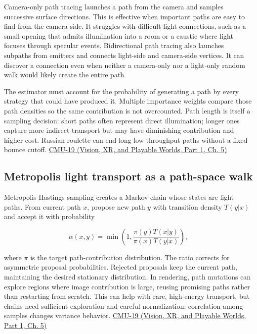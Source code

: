 Camera-only path tracing launches a path from the camera and samples successive surface directions. This is effective when important paths are easy to find from the camera side. It struggles with difficult light connections, such as a small opening that admits illumination into a room or a caustic where light focuses through specular events. Bidirectional path tracing also launches subpaths from emitters and connects light-side and camera-side vertices. It can discover a connection even when neither a camera-only nor a light-only random walk would likely create the entire path.

The estimator must account for the probability of generating a path by every strategy that could have produced it. Multiple importance weights compare those path densities so the same contribution is not overcounted. Path length is itself a sampling decision: short paths often represent direct illumination; longer ones capture more indirect transport but may have diminishing contribution and higher cost. Russian roulette can end long low-throughput paths without a fixed bounce cutoff. \href{../07-Vision-XR-and-Playable-Worlds-P01/main.pdf\#04-visual-computing-ii-ch036-cmu-19---variance-reduction}{CMU-19 (Vision, XR, and Playable Worlds, Part 1, Ch. 5)}

\subsection{Metropolis light transport as a path-space walk}\label{03-visual-computing-i-ch011-metropolis-light-transport-as-a-path-space-walk}

\hypertarget{03-visual-computing-i-ch011-metropolis-light-transport-as-a-path-space-walk}{}

Metropolis-Hastings sampling creates a Markov chain whose states are light paths. From current path \(x\), propose new path \(y\) with transition density \(T(y|x)\) and accept it with probability

\[
\alpha(x,y)=\min\left(1,\frac{\pi(y)T(x|y)}{\pi(x)T(y|x)}\right),
\]

where \(\pi\) is the target path-contribution distribution. The ratio corrects for asymmetric proposal probabilities. Rejected proposals keep the current path, maintaining the desired stationary distribution. In rendering, path mutations can explore regions where image contribution is large, reusing promising paths rather than restarting from scratch. This can help with rare, high-energy transport, but chains need sufficient exploration and careful normalization; correlation among samples changes variance behavior. \href{../07-Vision-XR-and-Playable-Worlds-P01/main.pdf\#04-visual-computing-ii-ch036-cmu-19---variance-reduction}{CMU-19 (Vision, XR, and Playable Worlds, Part 1, Ch. 5)}


